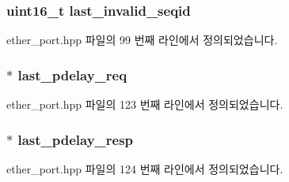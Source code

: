 \subsubsection[{\texorpdfstring{last\+\_\+invalid\+\_\+seqid}{last_invalid_seqid}}]{\setlength{\rightskip}{0pt plus 5cm}uint16\+\_\+t last\+\_\+invalid\+\_\+seqid\hspace{0.3cm}{\ttfamily [private]}}\hypertarget{class_ether_port_a21461d29642cccec51ab8838246128ca}{}\label{class_ether_port_a21461d29642cccec51ab8838246128ca}


ether\+\_\+port.\+hpp 파일의 99 번째 라인에서 정의되었습니다.

\subsubsection[{\texorpdfstring{last\+\_\+pdelay\+\_\+req}{last_pdelay_req}}]{$\ast$ last\+\_\+pdelay\+\_\+req\hspace{0.3cm}{\ttfamily [private]}}\hypertarget{class_ether_port_a4300731ae1f9227ce6fc7beb3ec7154e}{}\label{class_ether_port_a4300731ae1f9227ce6fc7beb3ec7154e}


ether\+\_\+port.\+hpp 파일의 123 번째 라인에서 정의되었습니다.

\subsubsection[{\texorpdfstring{last\+\_\+pdelay\+\_\+resp}{last_pdelay_resp}}]{$\ast$ last\+\_\+pdelay\+\_\+resp\hspace{0.3cm}{\ttfamily [private]}}\hypertarget{class_ether_port_ae42ae1d14ca1ea4fd052840dc72b3a81}{}\label{class_ether_port_ae42ae1d14ca1ea4fd052840dc72b3a81}


ether\+\_\+port.\+hpp 파일의 124 번째 라인에서 정의되었습니다.

